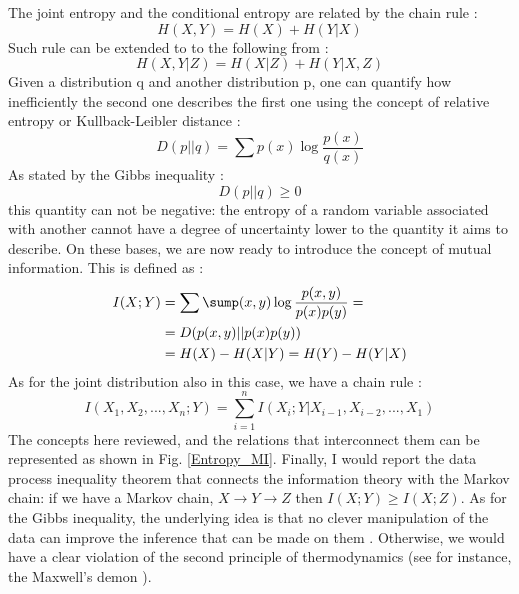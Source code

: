 \documentclass[12pt,%
               a4paper,%
               oneside,openany,%
               titlepage,%
               headinclude,footinclude,%
               BCOR5mm,%
               cleardoublepage=empty,%
               tablecaptionabove,%
               floatperchapter,
               ]{scrreprt}                 %
\begin{document}
The joint entropy and the conditional entropy are related by the chain rule \cite{cover2006elements}:
\begin{equation}
H(X,Y)=H(X)+H(Y|X)
\end{equation}
Such rule can be extended to to the following from \cite{cover2006elements}:
\begin{equation}
H(X,Y|Z)=H(X|Z)+H(Y|X,Z)
\end{equation}
Given a distribution q and another distribution p, one can quantify how inefficiently the second one describes the first one using the concept of relative entropy or Kullback-Leibler distance \cite{cover2006elements,mackay2003information}:
\begin{equation}
D(p||q)=\sum p(x)\log\frac{p(x)}{q(x)}
\end{equation}
As stated by the Gibbs inequality \cite{cover2006elements,mackay2003information}:
\begin{equation}
D(p||q)\geq 0
\end{equation}
this quantity can not be negative: the entropy of a random variable associated with another cannot have a degree of uncertainty lower to the quantity it aims to describe. On these bases, we are now ready to introduce the concept of mutual information. This is defined as  \cite{cover2006elements}:
\begin{equation}
\begin{split}
I(X;Y)&=\sum\sump(x,y)\log\dfrac{p(x,y)}{p(x)p(y)}=\\
&=D(p(x,y)||p(x)p(y)) \\
&=H(X)-H(X|Y)=H(Y)-H(Y|X)
\end{split}
\end{equation}
 As for the joint distribution also in this case, we have a chain rule  \cite{cover2006elements}:
\begin{equation}
I(X_{1},X_{2},...,X_{n};Y)=\sum^{n}_{i=1}I(X_{i};Y|X_{i-1},X_{i-2},...,X_{1})
\end{equation}
The concepts here reviewed, and the relations that interconnect them can be represented as shown in Fig. \ref{Entropy_MI}. Finally, I would report the data process inequality theorem that connects the information theory with the Markov chain: if we have a Markov chain, $X\rightarrow Y \rightarrow Z$  then $I(X;Y)\geq I(X;Z) $. As for the Gibbs inequality, the underlying idea is that no clever manipulation of the data can improve the inference that can be made on them \cite{cover2006elements,mackay2003information}. Otherwise, we would have a clear violation of the second principle of thermodynamics (see for instance, the Maxwell's demon \cite{feynman2018feynman}).
\end{document}
